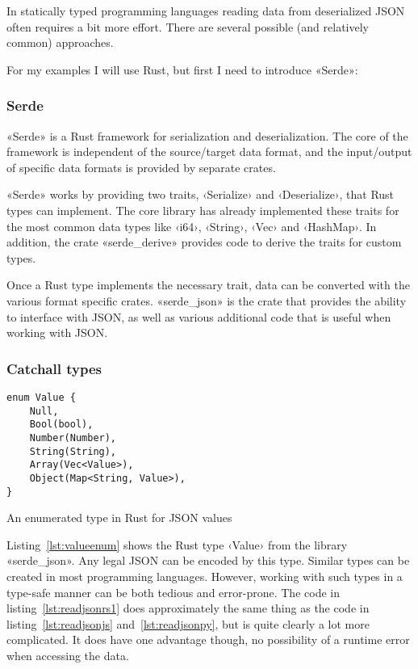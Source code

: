 In statically typed programming languages reading data from deserialized JSON often requires a bit more effort. There are several possible (and relatively common) approaches.

For my examples I will use Rust, but first I need to introduce «Serde»:

\subsubsection{Serde}

«Serde» is a Rust framework for serialization and deserialization. The core of the framework is independent of the source/target data format, and the input/output of specific data formats is provided by separate crates.

«Serde» works by providing two traits, ‹Serialize› and ‹Deserialize›, that Rust types can implement. The core library has already implemented these traits for the most common data types like ‹i64›, ‹String›, ‹Vec› and ‹HashMap›. In addition, the crate «serde_derive» provides code to derive the traits for custom types.

Once a Rust type implements the necessary trait, data can be converted with the various format specific crates. «serde_json» is the crate that provides the ability to interface with JSON, as well as various additional code that is useful when working with JSON.

\subsubsection{Catchall types}

\begin{listing}[ht!]
\begin{verbatim}
enum Value {
    Null,
    Bool(bool),
    Number(Number),
    String(String),
    Array(Vec<Value>),
    Object(Map<String, Value>),
}
\end{verbatim}
\caption{An enumerated type in Rust for JSON values}
\label{lst:valueenum}
\end{listing}

Listing~\ref{lst:valueenum} shows the Rust type ‹Value› from the library «serde_json». Any legal JSON can be encoded by this type. Similar types can be created in most programming languages. However, working with such types in a type-safe manner can be both tedious and error-prone. The code in listing~\ref{lst:readjsonrs1} does approximately the same thing as the code in listing~\ref{lst:readjsonjs} and~\ref{lst:readjsonpy}, but is quite clearly a lot more complicated. It does have one advantage though, no possibility of a runtime error when accessing the data.


